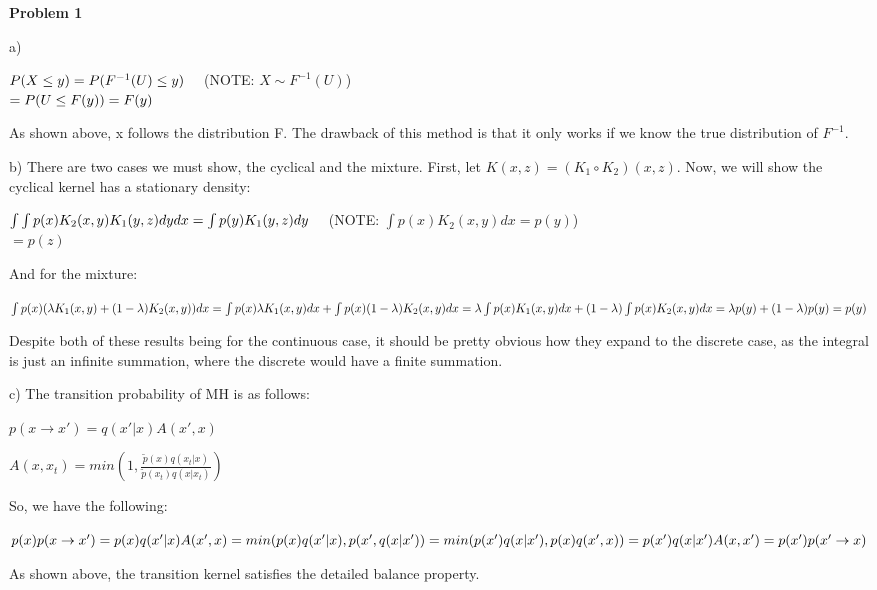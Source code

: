 \textbf{Problem 1}

a)

$P(X \leq y)\\
= P(F^{-1}(U) \leq y)\quad$ (NOTE: $X \sim F^{-1}(U)$)\\
$= P(U \leq F(y))\\
= F(y)$

As shown above, x follows the distribution F. The drawback of this method is that it only works if we know the true distribution of $F^{-1}$. 

b) There are two cases we must show, the cyclical and the mixture. First, let $K(x, z) = (K_1 \circ K_2)(x, z)$. Now, we will show the cyclical kernel has a stationary density:

$\int\int p(x)K_2(x, y)K_1(y, z) dy dx\\
= \int p(y)K_1(y, z) dy\quad$ (NOTE: $\int p(x)K_2(x, y) dx = p(y)$)\\
$= p(z)$

And for the mixture:

$\int p(x)(\lambda K_1(x, y) + (1-\lambda)K_2(x, y)) dx\\
= \int p(x)\lambda K_1(x, y)dx + \int p(x)(1-\lambda)K_2(x, y)dx\\
= \lambda\int p(x)K_1(x, y)dx + (1-\lambda)\int p(x)K_2(x, y)dx\\
= \lambda p(y) + (1-\lambda)p(y)\\
= p(y)$

Despite both of these results being for the continuous case, it should be pretty obvious how they expand to the discrete case, as the integral is just an infinite summation, where the discrete would have a finite summation.

c) The transition probability of MH is as follows:

$p(x \rightarrow x') = q(x' \vert x)A(x', x)$

$A(x, x_t) = min(1, \frac{\tilde{p}(x)q(x_t \vert x)}{\tilde{p}(x_t)q(x \vert x_t)})$

So, we have the following:

$p(x)p(x \rightarrow x')\\
= p(x)q(x' \vert x)A(x', x)\\
= min(p(x)q(x' \vert x), p(x', q(x\vert x'))\\
= min(p(x')q(x\vert x'), p(x)q(x', x))\\
= p(x')q(x\vert x')A(x, x')\\
= p(x')p(x' \rightarrow x)$

As shown above, the transition kernel satisfies the detailed balance property. 

